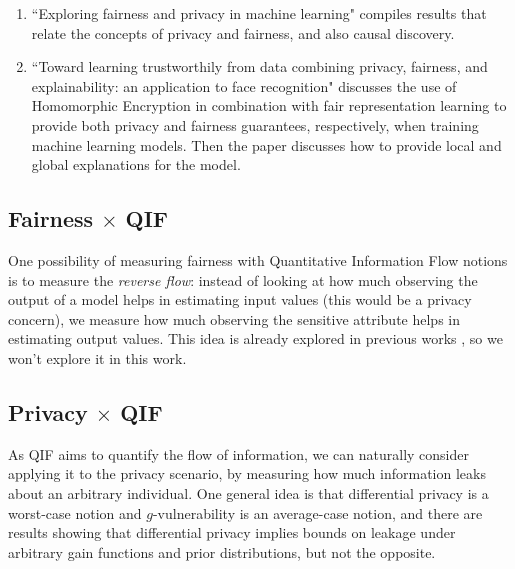 \documentclass[conference]{IEEEtran}
\newcommand{\qm}[1]{``#1"}
\begin{document}
\begin{enumerate}
	\item \qm{Exploring fairness and privacy in machine learning} \cite{henao2023exploring} compiles results that relate the concepts of privacy and fairness, and also causal discovery.
	\item \qm{Toward learning trustworthily from data combining privacy, fairness, and explainability: an application to face recognition} \cite{franco2021toward} discusses the use of Homomorphic Encryption in combination with fair representation learning \cite{zemel2013learning} to provide both privacy and fairness guarantees, respectively, when training machine learning models. Then the paper discusses how to provide local and global explanations for the model.
\end{enumerate}


\subsection{Fairness $\times$ QIF}

One possibility of measuring fairness with Quantitative Information Flow notions is to measure the \emph{reverse flow}: instead of looking at how much observing the output of a model helps in estimating input values (this would be a privacy concern), we measure how much observing the sensitive attribute helps in estimating output values. This idea is already explored in previous works \cite{Bruno}\cite{nogueira2023relation}, so we won't explore it in this work.

\subsection{Privacy $\times$ QIF}

As QIF aims to quantify the flow of information, we can naturally consider applying it to the privacy scenario, by measuring how much information leaks about an arbitrary individual. One general idea is that differential privacy is a worst-case notion and $g$-vulnerability is an average-case notion, and there are results \cite{QIF} showing that differential privacy implies bounds on leakage under arbitrary gain functions and prior distributions, but not the opposite.
\end{document}
